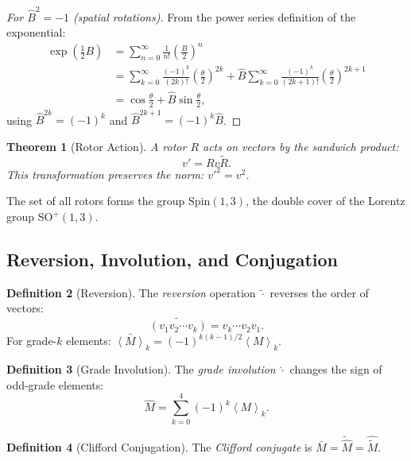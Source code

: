 \documentclass[11pt,a4paper]{article}
\numberwithin{equation}{section}
\theoremstyle{plain}
\newtheorem{theorem}{Theorem}[section]
\theoremstyle{definition}
\newtheorem{definition}[theorem]{Definition}
\theoremstyle{remark}
\newcommand{\grade}[2]{\left\langle #1 \right\rangle_{#2}}
\newcommand{\rev}[1]{\widetilde{#1}}       %
\newcommand{\Spin}{\mathrm{Spin}}
\newcommand{\SO}{\mathrm{SO}}
\begin{document}
\begin{proof}[For $\hat{B}^2 = -1$ (spatial rotations)]
From the power series definition of the exponential:
\begin{align}
\exp\left(\frac{1}{2}B\right) &= \sum_{n=0}^\infty \frac{1}{n!}\left(\frac{B}{2}\right)^n\\
&= \sum_{k=0}^\infty \frac{(-1)^k}{(2k)!}\left(\frac{\theta}{2}\right)^{2k} + \hat{B}\sum_{k=0}^\infty \frac{(-1)^k}{(2k+1)!}\left(\frac{\theta}{2}\right)^{2k+1}\\
&= \cos\frac{\theta}{2} + \hat{B}\sin\frac{\theta}{2},
\end{align}
using $\hat{B}^{2k} = (-1)^k$ and $\hat{B}^{2k+1} = (-1)^k\hat{B}$.
\end{proof}

\begin{theorem}[Rotor Action]
A rotor $R$ acts on vectors by the \emph{sandwich product}:
\begin{equation}
v' = R v \rev{R}.
\label{eq:rotor-action}
\end{equation}
This transformation preserves the norm: $v'^2 = v^2$.
\end{theorem}

The set of all rotors forms the group $\Spin(1,3)$, the double cover of the Lorentz group $\SO^+(1,3)$.

\subsection{Reversion, Involution, and Conjugation}

\begin{definition}[Reversion]
The \emph{reversion} operation $\rev{\cdot}$ reverses the order of vectors:
\begin{equation}
\rev{(v_1 v_2 \cdots v_k)} = v_k \cdots v_2 v_1.
\end{equation}
For grade-$k$ elements: $\rev{\grade{M}{k}} = (-1)^{k(k-1)/2}\grade{M}{k}$.
\end{definition}

\begin{definition}[Grade Involution]
The \emph{grade involution} $\hat{\cdot}$ changes the sign of odd-grade elements:
\begin{equation}
\hat{M} = \sum_{k=0}^4 (-1)^k \grade{M}{k}.
\end{equation}
\end{definition}

\begin{definition}[Clifford Conjugation]
The \emph{Clifford conjugate} is $\bar{M} = \rev{\hat{M}} = \widehat{\rev{M}}$.
\end{definition}
\end{document}
